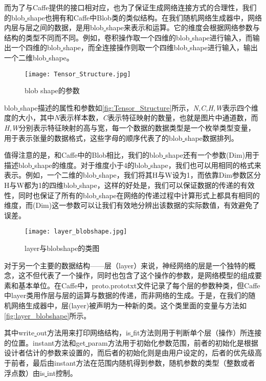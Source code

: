 而为了与Caffe提供的接口相对应，也为了保证生成网络连接方式的合理性，我们的blob\underline{ }shape也拥有和Caffe中Blob类的类似结构。在我们随机网络生成器中，网络内层与层之间的数据，是用blob\underline{ }shape来表示和运算。它的维度会根据网络参数与结构的类型不同而不同。例如，卷积操作取一个四维的blob\underline{ }shape进行输入，而输出一个四维的blob\underline{ }shape，而全连接操作则取一个四维blob\underline{ }shape进行输入，输出一个二维blob\underline{ }shape。

\begin{figure}[!htbp]
\centering
\texttt{[image: Tensor\_Structure.jpg]}
\caption{blob shape的参数}
\label{fig:Tensor_Structure}
\end{figure}

blob\underline{ }shape描述的属性和参数如\autoref{fig:Tensor_Structure}所示，\emph{N,C,H,W}表示四个维度的大小，其中\emph{N}表示样本数，\emph{C}表示特征映射的数量，也就是图片中通道数，而\emph{H,W}分别表示特征映射的高与宽，每一个数据的数据类型是一个枚举类型变量，用于表示张量的数据格式，这些字母的顺序代表了的blob\underline{ }shape数据排列。

值得注意的是，和Caffe中的Blob相比，我们的blob\underline{ }shape还有一个参数(Dim)用于描述blob\underline{ }shape的维度。对于维度小于4的blob\underline{ }shape，我们也可以用相同的格式来表示。例如，一个二维的blob\underline{ }shape，我们将其H与W设为1，而依靠Dim参数区分H与W都为1的四维blob\underline{ }shape，这样的好处是，我们可以保证数据的传递的有效性，同时也保证了所有的blob\underline{ }shape在网络的传递过程中计算形式上都具有相同的维度，而(Dim)这一参数可以让我们有效地分辨出该数据的实际数值，有效避免了误差。

\begin{figure}[!htbp]
\centering
\texttt{[image: layer\_blobshape.jpg]}
\caption{layer与blobshape的类图}
\label{fig:layer_blobshape}
\end{figure}

对于另一个主要的数据结构——层（layer）来说，神经网络的层是一个独特的概念，这不但代表了一个操作，同时也包含了这个操作的参数，是网络模型的组成要素和基本单位。在Caffe中，proto.prototxt文件记录了每个层的参数种类，但Caffe中layer类用作层与层的运算与数据的传递，而非网络的生成。于是，在我们的随机网络生成器中，层(layer)被声明为一种新的类。这个类里面的变量与方法如\autoref{fig:layer_blobshape}所示。

其中write\underline{ }out方法用来打印网络结构，is\underline{ }fit方法则用于判断单个层（操作）所连接的位置。instant方法和get\underline{ }param方法用于初始化参数范围，前者的初始化是根据设计者估计的参数来设置的，而后者的初始化则是由用户设定的，后者的优先级高于前者，最后由instant方法在范围内随机得到参数，随机参数的类型（整数或者浮点数）由is\underline{ }int控制。

